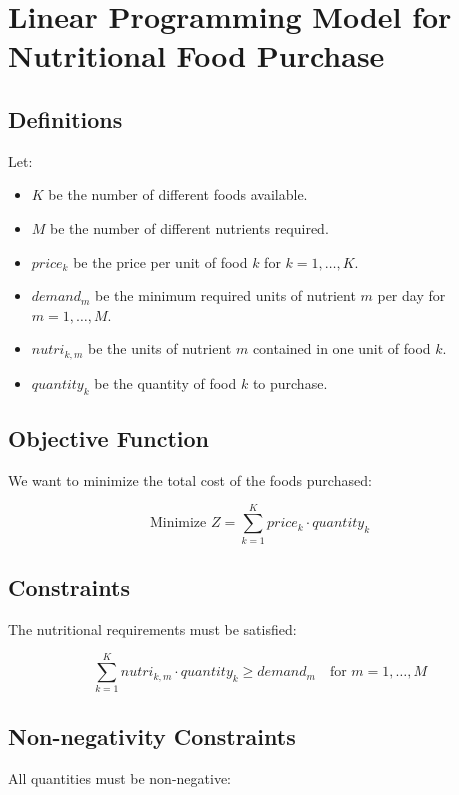 \documentclass{article}
\begin{document}
\section*{Linear Programming Model for Nutritional Food Purchase}

\subsection*{Definitions}

Let:
\begin{itemize}
    \item \( K \) be the number of different foods available.
    \item \( M \) be the number of different nutrients required.
    \item \( price_k \) be the price per unit of food \( k \) for \( k = 1, \ldots, K \).
    \item \( demand_m \) be the minimum required units of nutrient \( m \) per day for \( m = 1, \ldots, M \).
    \item \( nutri_{k,m} \) be the units of nutrient \( m \) contained in one unit of food \( k \).
    \item \( quantity_k \) be the quantity of food \( k \) to purchase.
\end{itemize}

\subsection*{Objective Function}

We want to minimize the total cost of the foods purchased:

\[
\text{Minimize } Z = \sum_{k=1}^{K} price_k \cdot quantity_k
\]

\subsection*{Constraints}

The nutritional requirements must be satisfied:

\[
\sum_{k=1}^{K} nutri_{k,m} \cdot quantity_k \geq demand_m \quad \text{for } m = 1, \ldots, M
\]

\subsection*{Non-negativity Constraints}

All quantities must be non-negative:
\end{document}

